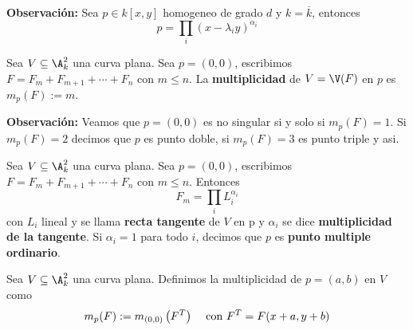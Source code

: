 \documentclass{article}
\begin{document}
\vspace{4mm}
\noindent\textbf{Observación:} Sea $p\in k[x,y]$ homogeneo de grado $d$ y $k=\overline{k}$, 
entonces
\begin{equation*}
    p=\prod_{i}(x-\lambda_{i}y)^{\alpha_{i}}
\end{equation*}
\begin{dfn}
    Sea $V\subseteq\A_{k}^{2}$ una curva plana. Sea $p=(0,0)$, escribimos 
    $F=F_{m}+F_{m+1}+\cdots+F_{n}$ con $m\leq n$. La \textbf{multiplicidad} de $V=\V(F)$ en $p$ es
    $m_{p}(F):=m$.
\end{dfn}
\noindent\textbf{Observación:} Veamos que $p=(0,0)$ es no singular si y solo si $m_{p}(F)=1$. Si 
$m_{p}(F)=2$ decimos que $p$ es punto doble, si $m_{p}(F)=3$ es punto triple y asi.
\begin{dfn}
    Sea $V\subseteq\A_{k}^{2}$ una curva plana. Sea $p=(0,0)$, escribimos 
    $F=F_{m}+F_{m+1}+\cdots+F_{n}$ con $m\leq n$. Entonces
    \begin{equation*}
        F_{m}=\prod_{i}L_{i}^{\alpha_{i}}
    \end{equation*}
    con $L_{i}$ lineal y se llama \textbf{recta tangente} de $V$ en p y $\alpha_{i}$ se dice 
    \textbf{multiplicidad de la tangente}. Si $\alpha_{i}=1$ para todo $i$, decimos que $p$ es 
    \textbf{punto multiple 
    ordinario}.
\end{dfn}
\begin{dfn}
    Sea $V\subseteq\A_{k}^{2}$ una curva plana. Definimos la multiplicidad de $p=(a,b)$ en $V$ 
    como
    \begin{equation*}
        m_{p}(F):=m_{(0,0)}\left(F^{T}\right)\hspace{4mm}\text{con }F^{T}=F(x+a,y+b)
    \end{equation*}
\end{dfn}
\end{document}
